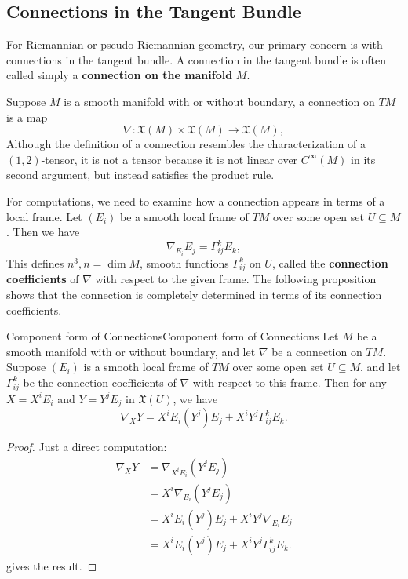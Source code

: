 \documentclass[../main.tex]{subfiles}
\begin{document}
\subsection{Connections in the Tangent Bundle}
For Riemannian or pseudo-Riemannian geometry, our primary concern is with connections in the tangent bundle. A connection in the tangent bundle is often called simply a \textbf{connection on the manifold} $M$.

Suppose $M$ is a smooth manifold with or without boundary, a connection on $TM$ is a map
\begin{equation}
	\nabla: \mathfrak{X}(M) \times \mathfrak{X}(M) \to \mathfrak{X}(M),
\end{equation}
Although the definition of a connection resembles the characterization of a $(1, 2)$-tensor, it is not a tensor because it is not linear over $C^{\infty}(M)$ in its second argument, but instead satisfies the product rule.

For computations, we need to examine how a connection appears in terms of a local frame. Let $(E_i)$ be a smooth local frame of $TM$ over some open set $U \subseteq M$. Then we have
\begin{equation}
	\nabla_{E_i} E_j = \Gamma_{ij}^k E_k,
\end{equation}
This defines $n^3, n=\dim M$, smooth functions $\Gamma_{ij}^k$ on $U$, called the \textbf{connection coefficients} of $\nabla$ with respect to the given frame. The following proposition shows that the connection is completely determined in terms of its connection coefficients.
\begin{proposition}{Component form of Connections}{Component form of Connections}
	Let $M$ be a smooth manifold with or without boundary, and let $\nabla$ be a connection on $TM$. Suppose $(E_i)$ is a smooth local frame of $TM$ over some open set $U \subseteq M$, and let $\Gamma_{ij}^k$ be the connection coefficients of $\nabla$ with respect to this frame. Then for any $X = X^i E_i$ and $Y = Y^j E_j$ in $\mathfrak{X}(U)$, we have
	\begin{equation}\label{eq:Component form of Connections}
		\nabla_X Y = X^i E_i(Y^j) E_j + X^i Y^j \Gamma_{ij}^k E_k.
	\end{equation}
\end{proposition}
\begin{proof}
	Just a direct computation:
	\begin{equation*}
		\begin{aligned}
			\nabla_X Y & = \nabla_{X^i E_i} (Y^j E_j)                    \\
			           & = X^i \nabla_{E_i} (Y^j E_j)                    \\
			           & = X^i E_i(Y^j) E_j + X^i Y^j \nabla_{E_i} E_j   \\
			           & = X^i E_i(Y^j) E_j + X^i Y^j \Gamma_{ij}^k E_k.
		\end{aligned}
	\end{equation*}
	gives the result.
\end{proof}
\end{document}
